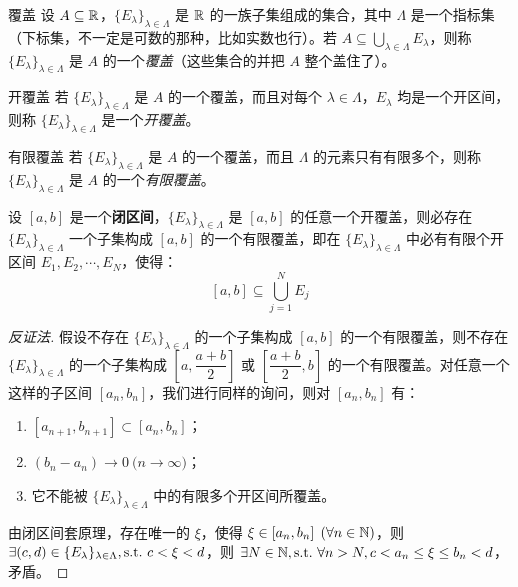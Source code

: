 \begin{definition}{覆盖}
	设 $A \subseteq \mathbb R$，$\{E_\lambda\}_{\lambda \in \Lambda}$ 是 $\mathbb R$ 的一族子集组成的集合，其中 $\Lambda$ 是一个指标集（下标集，不一定是可数的那种，比如实数也行）。若 $A \subseteq \bigcup\limits_{\lambda \in \Lambda} E_\lambda$，则称 $\{E_\lambda\}_{\lambda \in \Lambda}$ 是 $A$ 的一个\emph{覆盖}（这些集合的并把 $A$ 整个盖住了）。
\end{definition}

\begin{definition}{开覆盖}
	若 $\{E_\lambda\}_{\lambda \in \Lambda}$ 是 $A$ 的一个覆盖，而且对每个 $\lambda \in \Lambda$，$E_\lambda$ 均是一个开区间，则称 $\{E_\lambda\}_{\lambda \in \Lambda}$ 是一个\emph{开覆盖}。
\end{definition}

\begin{definition}{有限覆盖}
	若 $\{E_\lambda\}_{\lambda \in \Lambda}$ 是 $A$ 的一个覆盖，而且 $\Lambda$ 的元素只有有限多个，则称 $\{E_\lambda\}_{\lambda \in \Lambda}$ 是 $A$ 的一个\emph{有限覆盖}。
\end{definition}

\begin{theorem}[有限覆盖定理]
	设 $[a, b]$ 是一个\textbf{闭区间}，$\{E_\lambda\}_{\lambda \in \Lambda}$ 是 $[a, b]$ 的任意一个开覆盖，则必存在 $\{E_\lambda\}_{\lambda \in \Lambda}$ 一个子集构成 $[a, b]$ 的一个有限覆盖，即在 $\{E_\lambda\}_{\lambda \in \Lambda}$ 中必有有限个开区间 $E_1, E_2, \cdots, E_N$，使得：
	$$
	[a, b] \subseteq \bigcup\limits_{j = 1}^N E_j
	$$
\end{theorem}

\begin{proof}[反证法]
	假设不存在 $\{E_\lambda\}_{\lambda \in \Lambda}$ 的一个子集构成 $[a, b]$ 的一个有限覆盖，则不存在 $\{E_\lambda\}_{\lambda \in \Lambda}$ 的一个子集构成 $\left[ a, \dfrac{a + b}{2} \right]$ 或 $\left[ \dfrac{a + b}{2}, b \right]$ 的一个有限覆盖。对任意一个这样的子区间 $[a_n, b_n]$，我们进行同样的询问，则对 $[a_n, b_n]$ 有：

	\begin{enumerate}
		\item $[a_{n + 1}, b_{n + 1}] \subset [a_n, b_n]$；
		\item $(b_n - a_n) \rightarrow 0 \pod{n \rightarrow \infty}$；
		\item 它不能被 $\{E_\lambda\}_{\lambda \in \Lambda}$ 中的有限多个开区间所覆盖。
	\end{enumerate}

	由闭区间套原理，存在唯一的 $\xi$，使得 $\xi \in [a_n, b_n] \pod{\forall n \in \mathbb N}$，则 $\exists (c, d) \in \{E_\lambda\}_{\lambda \in \Lambda}, \text{s.t.~} c < \xi < d$，则 $\exists N \in \mathbb N, \text{s.t.~} \forall n > N, c < a_n \le \xi \le b_n < d$，矛盾。
\end{proof}

